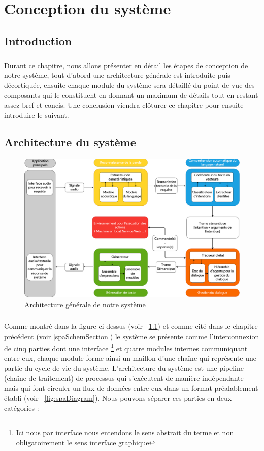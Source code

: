\chapter{Conception du système}

\section{Introduction}
\paragraph{}
Durant ce chapitre, nous allons présenter en détail les étapes de conception de notre système, tout d'abord une architecture générale est introduite puis décortiquée, ensuite chaque module du système sera détaillé du point de vue des composants qui le constituent en donnant un maximum de détails tout en restant assez bref et concis. Une conclusion viendra clôturer ce chapitre pour ensuite introduire le suivant.
\section{Architecture du système}
\begin{figure}[H]
	\centering
	\includegraphics[width=0.85\linewidth]{images/SPA_architecture.png}
	\caption{Architecture générale de notre système}
	\label{spaArch}
\end{figure}
\paragraph{}
Comme montré dans la figure ci dessus (voir ~\ref{spaArch}) et comme cité dans le chapitre précédent (voir \ref{spaSchemSection}) le système se présente comme l'interconnexion de cinq parties dont une interface \footnote{Ici nous par interface nous entendons le sens abstrait du terme et non obligatoirement le sens interface graphique} et quatre modules internes communiquant entre eux, chaque module forme ainsi un maillon d'une chaîne qui représente une partie du cycle de vie du système. L'architecture du système est une pipeline (chaîne de traitement) de processus qui s'exécutent de manière indépendante mais qui font circuler un flux de données entre eux dans un format préalablement établi (voir ~\ref{fig:spaDiagram}). Nous pouvons séparer ces parties en deux catégories :
